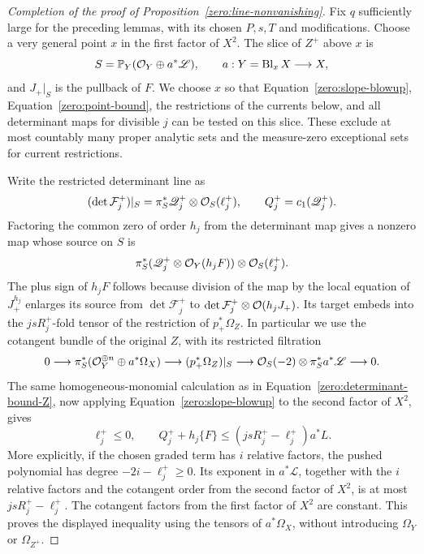 \begin{proof}[Completion of the proof of Proposition~\ref{zero:line-nonvanishing}]
Fix \(q\) sufficiently large for the preceding lemmas, with its chosen
\(P,s,T\) and modifications.  Choose a very general point \(x\) in the first
factor of \(X^2\).  The slice of \(Z^+\) above \(x\) is
\[
 S=\mathbb{P}_Y(\mathcal O_Y\oplus a^*\mathscr L),\qquad
 a:Y=\operatorname{Bl}_xX\longrightarrow X,
\]
and \(J_+|_S\) is the pullback of \(F\).  We choose \(x\) so that
Equation~\eqref{zero:slope-blowup}, Equation~\eqref{zero:point-bound}, the restrictions of
the currents below, and all determinant maps for divisible \(j\)
can be tested on this slice.  These exclude at most countably many
proper analytic sets and the measure-zero exceptional sets for
current restrictions.

Write the restricted determinant line as
\[
 (\det\mathcal F_j^+)|_S
   =\pi_S^*\mathscr Q_j^+\otimes\mathcal O_S(\ell_j^+),\qquad
 Q_j^+=c_1(\mathscr Q_j^+).
\]
Factoring the common zero of order \(h_j\) from the determinant
map gives a nonzero map whose source on \(S\) is
\[
 \pi_S^*(\mathscr Q_j^+\otimes\mathcal O_Y(h_jF))
                 \otimes\mathcal O_S(\ell_j^+).
\]
The plus sign of \(h_jF\) follows because division of the map by
the local equation of \(J_+^{h_j}\) enlarges its source from
\(\det\mathcal F_j^+\) to
\(\det\mathcal F_j^+\otimes\mathcal O(h_jJ_+)\).
Its target embeds into the \(jsR_j^+\)-fold tensor of the
restriction of \(p_+^*\Omega_Z\).  In particular we use the
cotangent bundle of the original \(Z\), with its restricted
filtration
\[
 0\longrightarrow
 \pi_S^*(\mathcal O_Y^{\oplus n}\oplus a^*\Omega_X)
 \longrightarrow (p_+^*\Omega_Z)|_S
 \longrightarrow
 \mathcal O_S(-2)\otimes\pi_S^*a^*\mathscr L
 \longrightarrow0.
\]
The same homogeneous-monomial calculation as in
Equation~\eqref{zero:determinant-bound-Z}, now applying
Equation~\eqref{zero:slope-blowup} to the second factor of \(X^2\), gives
\begin{equation}\label{zero:determinant-bound-slice}
 \ell_j^+\le0,\qquad
 Q_j^++h_j\{F\}
       \le(jsR_j^+-\ell_j^+)a^*L.
\end{equation}
More explicitly, if the chosen graded term has \(i\) relative
factors, the pushed polynomial has degree
\(-2i-\ell_j^+\ge0\).  Its exponent in \(a^*\mathscr L\), together
with the \(i\) relative factors and the cotangent order from the second
factor of \(X^2\), is at most \(jsR_j^+-\ell_j^+\).  The cotangent
factors from the first factor of \(X^2\) are constant.  This proves the
displayed inequality using
the tensors of \(a^*\Omega_X\), without introducing \(\Omega_Y\)
or \(\Omega_{Z^+}\).


\end{proof}
